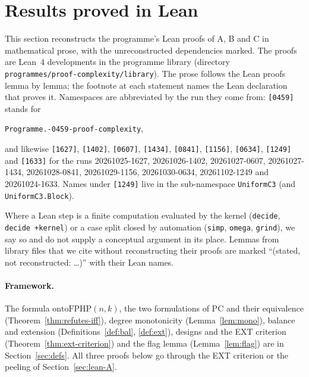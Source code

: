 \providecommand{\lean}[1]{\footnote{\raggedright Lean: \texttt{#1}.}}

\section{Results proved in Lean}\label{sec:lean}

\begingroup\sloppy %
This section reconstructs the programme's Lean proofs of A, B and C in
mathematical prose, with the unreconstructed dependencies marked.  The proofs are Lean~4
developments in the programme library (directory
\texttt{programmes/\allowbreak proof-complexity/\allowbreak library}).  The prose follows the Lean
proofs lemma by lemma; the footnote at each statement names the Lean
declaration that proves it.  Namespaces are abbreviated by the run they come
from: \texttt{[0459]} stands for
\begin{center}
\texttt{Programme.-0459-proof-complexity\guillemotright},
\end{center}
and likewise \texttt{[1627]}, \texttt{[1402]}, \texttt{[0607]}, \texttt{[1434]},
\texttt{[0841]}, \texttt{[1156]}, \texttt{[0634]}, \texttt{[1249]} and \texttt{[1633]} for
the runs 20261025-1627, 20261026-1402, 20261027-0607, 20261027-1434, 20261028-0841,
20261029-1156, 20261030-0634, 20261102-1249 and 20261024-1633.  Names under \texttt{[1249]} live in
the sub-namespace \texttt{UniformC3} (and \texttt{UniformC3.Block}).

Where a Lean step is a finite computation evaluated by the kernel
(\texttt{decide}, \texttt{decide +kernel}) or a case split closed by automation
(\texttt{simp}, \texttt{omega}, \texttt{grind}), we say so and do not supply a
conceptual argument in its place.  Lemmas from library files that we cite without reconstructing their proofs are marked
``(stated, not reconstructed: \ldots)'' with their Lean names.

\paragraph{Framework.}
The formula $\mathrm{ontoFPHP}(n,k)$, the two formulations of PC and their equivalence
(Theorem~\ref{thm:refutes-iff}), degree monotonicity (Lemma~\ref{lem:mono}), balance and
extension (Definitions~\ref{def:bal}, \ref{def:ext}), designs and the EXT criterion
(Theorem~\ref{thm:ext-criterion}) and the flag lemma (Lemma~\ref{lem:flag}) are in
Section~\ref{sec:defs}.  All three proofs below go through the EXT criterion or the
peeling of Section~\ref{sec:lean-A}.

